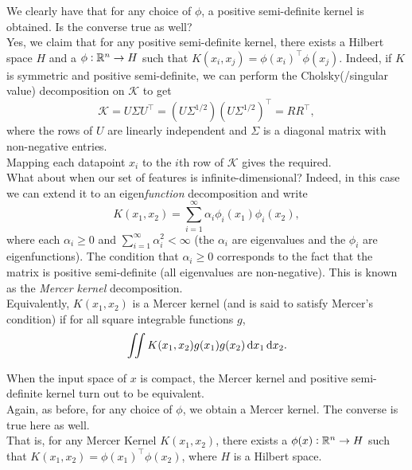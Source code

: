\documentclass{article}
\begin{document}
		We clearly have that for any choice of $\phi$, a positive semi-definite kernel is obtained. Is the converse true as well?\\
		Yes, we claim that for any positive semi-definite kernel, there exists a Hilbert space $H$ and a $\phi:\mathbb{R}^n \to H$ such that $K(x_i,x_j) = \phi(x_i)^\top \phi(x_j)$. Indeed, if $K$ is symmetric and positive semi-definite, we can perform the Cholsky(/singular value) decomposition on $\mathcal{K}$ to get
		\[ \mathcal{K} = U\Sigma U^\top = (U\Sigma^{1/2})(U\Sigma^{1/2})^\top = RR^\top, \]
		where the rows of $U$ are linearly independent and $\Sigma$ is a diagonal matrix with non-negative entries.\\
		Mapping each datapoint $x_i$ to the $i$th row of $\mathcal{K}$ gives the required.\\

		What about when our set of features is infinite-dimensional? Indeed, in this case we can extend it to an eigen\emph{function} decomposition and write
		\[ K(x_1,x_2) = \sum_{i=1}^\infty \alpha_i \phi_i(x_1) \phi_i(x_2), \]
		where each $\alpha_i \ge 0$ and $\sum_{i=1}^\infty \alpha_i^2 < \infty$ (the $\alpha_i$ are eigenvalues and the $\phi_i$ are eigenfunctions). The condition that $\alpha_i \ge 0$ corresponds to the fact that the matrix is positive semi-definite (all eigenvalues are non-negative). This is known as the \emph{Mercer kernel} decomposition.\\

		Equivalently, $K(x_1,x_2)$ is a Mercer kernel (and is said to satisfy Mercer's condition) if for all square integrable functions $g$,
		\[ \iint K(x_1,x_2) g(x_1) g(x_2) \dif x_1 \dif x_2. \]

		When the input space of $x$ is compact, the Mercer kernel and positive semi-definite kernel turn out to be equivalent.\\
		
		Again, as before, for any choice of $\phi$, we obtain a Mercer kernel. The converse is true here as well.\\
		That is, for any Mercer Kernel $K(x_1,x_2)$, there exists a $\phi(x) : \mathbb{R}^n \to H$ such that $K(x_1,x_2) = \phi(x_1)^\top \phi(x_2)$, where $H$ is a Hilbert space.\\

		 


% 
% 
\end{document}

